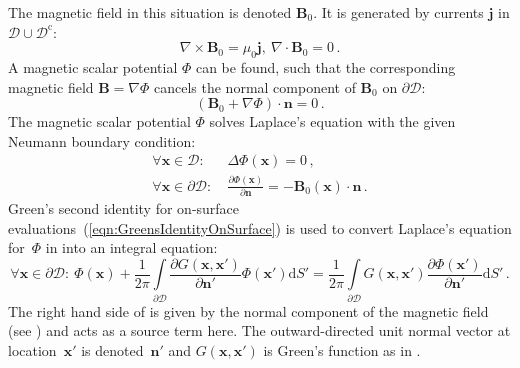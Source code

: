 The magnetic field in this situation is denoted $\mathbf{B}_0$.
It is generated by currents $\mathbf{j}$ in $\mathcal{D} \cup \mathcal{D}^\mathrm{c}$:
\begin{equation}
  \nabla \times \mathbf{B}_0 = \mu_0 \mathbf{j}, ~ \nabla \cdot \mathbf{B}_0 = 0 \, .
\end{equation}
A magnetic scalar potential $\Phi$ can be found,
such that the corresponding magnetic field $\mathbf{B} = \nabla \Phi$ cancels the normal component of $\mathbf{B}_0$ on $\partial\mathcal{D}$:
\begin{equation}
  \left( \mathbf{B}_0 + \nabla \Phi \right) \cdot \mathbf{n} = 0 \, .
\end{equation}
The magnetic scalar potential $\Phi$ solves Laplace's equation
with the given Neumann boundary condition:
\begin{align}
  \forall \mathbf{x} \in \mathcal{D}:         &~ \Delta \Phi(\mathbf{x}) = 0 \, , \label{eqn:laplacePhi} \\
  \forall \mathbf{x} \in \partial\mathcal{D}: &~ \frac{\partial \Phi(\mathbf{x})}{\partial \mathbf{n}} = - \mathbf{B}_0(\mathbf{x}) \cdot \mathbf{n} \, . \label{eqn:bnorm}
\end{align}
Green's second identity for on-surface evaluations~(\ref{eqn:GreensIdentityOnSurface}) is used
to convert Laplace's equation for~$\Phi$ in  into an integral equation:
\begin{equation}
  \forall \mathbf{x} \in \partial \mathcal{D}: ~
  \Phi(\mathbf{x}) + \frac{1}{2 \pi} \int\limits_{\partial\mathcal{D}} \frac{\partial G(\mathbf{x},\mathbf{x}')}{\partial \mathbf{n}'}                \Phi(\mathbf{x}')                        \mathrm{d}S'
                   = \frac{1}{2 \pi} \int\limits_{\partial\mathcal{D}}                G(\mathbf{x},\mathbf{x}')                        \frac{\partial \Phi(\mathbf{x}')}{\partial \mathbf{n}'} \mathrm{d}S' \, .
  \label{eqn:laplaceIntegral}
\end{equation}
The right hand side of  is given by the normal component of the magnetic field (see )
and acts as a source term here. The outward-directed unit normal vector at location~$\mathbf{x}'$ is denoted~$\mathbf{n}'$
and $G(\mathbf{x},\mathbf{x}')$ is Green's function as in .

\FloatBarrier
